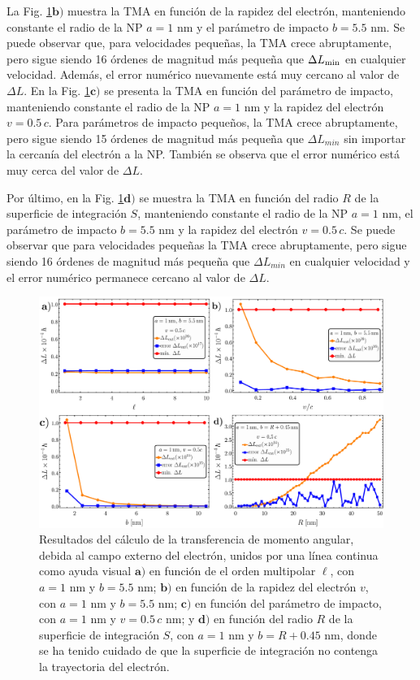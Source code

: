 La Fig. \ref{fig: results ext Delta L}\hyperref[fig: results ext Delta L]{$\mathbf{b)}$} muestra la TMA en función de la rapidez del electrón, manteniendo constante el radio de la NP $a=1$ nm y el parámetro de impacto $b = 5.5$ nm. Se puede observar que, para velocidades pequeñas, la TMA crece abruptamente, pero sigue siendo 16 órdenes de magnitud más pequeña que $\Delta L_{\rm min}$ en cualquier velocidad. Además, el error numérico nuevamente está muy cercano al valor de $\Delta L$. En la Fig. \ref{fig: results ext Delta L}\hyperref[fig: results ext Delta L]{$\mathbf{c)}$} se presenta la TMA en función del parámetro de impacto, manteniendo constante el radio de la NP $a=1$ nm y la rapidez del electrón $v = 0.5\, c$. Para parámetros de impacto pequeños, la TMA crece abruptamente, pero sigue siendo 15 órdenes de magnitud más pequeña que $\Delta L_{min}$ sin importar la cercanía del electrón a la NP. También se observa que el error numérico está muy cerca del valor de $\Delta L$. 

Por último, en la Fig. \ref{fig: results ext Delta L}\hyperref[fig: results ext Delta L]{$\mathbf{d)}$} se muestra la TMA en función del radio $R$ de la superficie de integración $S$, manteniendo constante el radio de la NP $a = 1$ nm, el parámetro de impacto $b = 5.5$ nm y la rapidez del electrón $v = 0.5\, c$. Se puede observar que para velocidades pequeñas la TMA crece abruptamente, pero sigue siendo 16 órdenes de magnitud más pequeña que $\Delta L_{min}$ en cualquier velocidad y el error numérico permanece cercano al valor de $\Delta L$.

\begin{figure}[ht!]
\centering
\includegraphics[width=0.8\linewidth]{17-imagenes/3-AppendixB/Results.pdf}
\caption{\label{fig: results ext Delta L} Resultados del cálculo de la transferencia de momento angular, debida al campo externo del electrón, unidos por una línea continua como ayuda visual $\mathbf{a)}$ en función de  el orden multipolar $\ell$, con $a=1$ nm y $b=5.5$ nm; $\mathbf{b)}$ en función de la rapidez del electrón $v$, con $a=1$ nm y $b=5.5$ nm; $\mathbf{c)}$ en función del parámetro de impacto, con $a=1$ nm y $v=0.5 \,c$ nm; y $\mathbf{d)}$ en función del radio $R$ de la superficie de integración $S$, con $a=1$ nm y $b=R +0.45$ nm, donde se ha tenido cuidado de que la superficie de integración no contenga la trayectoria del electrón.}
\end{figure}